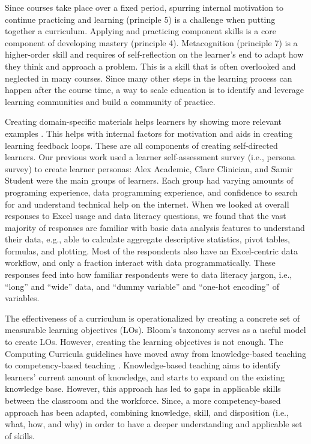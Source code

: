 \documentclass[030-workshop.tex]{subfiles}
\begin{document}
    Since courses take place over a fixed period,
    spurring internal motivation to continue practicing and learning (principle 5) is a challenge when putting together a curriculum.
    Applying and practicing component skills is a core component of developing mastery (principle 4).
    Metacognition (principle 7) is a higher-order skill and requires of self-reflection on the learner's end
    to adapt how they think and approach a problem.
    This is a skill that is often overlooked and neglected in many courses.
    Since many other steps in the learning process can happen after the course time,
    a way to scale education is to identify and leverage learning communities
    and build a community of practice. %

    Creating domain-specific materials helps learners by showing more relevant examples
    \cite{ambrose2010learning, Koch2016, wilson2019teaching, krossDemocratizationDataScience2020}.
    This helps with internal factors for motivation and aids in creating learning feedback loops.
    These are all components of creating self-directed learners.
    Our previous work used a learner self-assessment survey (i.e., persona survey) to create learner personas:
    Alex Academic, Clare Clinician, and Samir Student were the main groups of learners.
    Each group had varying amounts of
    programing experience, data programming experience, and
    confidence to search for and understand technical help on the internet.
    When we looked at overall responses to Excel usage and data literacy questions,
    we found that the vast majority of responses are familiar with basic data analysis features to understand their data,
    e.g., able to calculate aggregate descriptive statistics,
    pivot tables,
    formulas,
    and plotting. %
    Most of the respondents also have an Excel-centric data workflow,
    and only a fraction interact with data programmatically. %
    These responses feed into how familiar respondents were to data literacy jargon, i.e., ``long'' and ``wide'' data,
    and ``dummy variable'' and ``one-hot encoding'' of variables.

    The effectiveness of a curriculum is operationalized by creating a concrete set of
    measurable learning objectives (LOs).
    Bloom's taxonomy serves as a useful model to create LOs.
    However, creating the learning objectives is not enough.
    The Computing Curricula guidelines have moved away from knowledge-based teaching to competency-based teaching
    \cite{cc2005, cc2020, ccdsc2021}.
    Knowledge-based teaching aims to identify learners' current amount of knowledge,
    and starts to expand on the existing knowledge base.
    However, this approach has led to gaps in applicable skills between the classroom and the workforce.
    Since, a more competency-based approach has been adapted,
    combining knowledge, skill, and disposition (i.e., what, how, and why) in order
    to have a deeper understanding and applicable set of skills.
\end{document}
